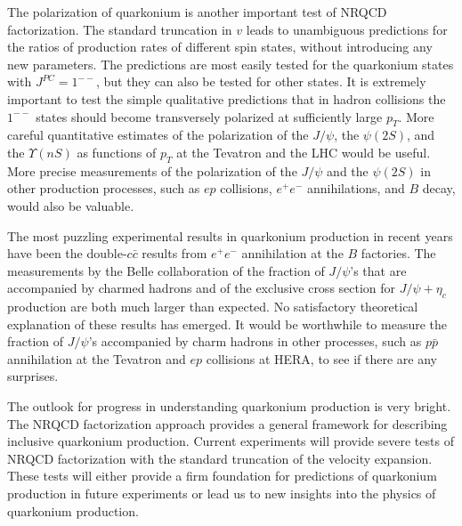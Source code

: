 The polarization of quarkonium is another important test of NRQCD
factorization.  The standard truncation in $v$ leads to unambiguous
predictions for the ratios of production rates of different
spin states,  without introducing any new parameters.  The
predictions are most easily tested for the quarkonium
states with $J^{PC} = 1^{--}$, but they can also be tested for other 
states.  It is extremely important to test the simple qualitative 
predictions that in hadron collisions the $1^{--}$ states should become 
transversely polarized at sufficiently large $p_T$.  More careful 
quantitative estimates of the polarization of the $J/\psi$, the 
$\psi(2S)$, and the
$\Upsilon (nS)$ as functions of $p_T$ at the Tevatron and the LHC
would be useful.  More precise measurements of the polarization of
the $J/\psi$ and the $\psi(2S)$ in other production processes,
such as $ep$ collisions, $e^+e^-$ annihilations, and $B$ decay, would
also be valuable.

The most puzzling experimental results in quarkonium production in recent 
years have been the double-$c \bar c$ results from $e^+e^-$ annihilation at 
the $B$ factories.  The measurements by the Belle collaboration of the 
fraction of $J/\psi$'s that are accompanied by charmed hadrons and 
of the 
exclusive cross section for $J/\psi + \eta_c$ production are both much 
larger than 
expected.  No satisfactory theoretical explanation of these results has 
emerged.  It would be worthwhile to measure the fraction of $J/\psi$'s 
accompanied by charm hadrons in other processes, such as $p \bar p$ 
annihilation at the Tevatron and $ep$ collisions at HERA, to see if there 
are any surprises.

The outlook for progress in understanding quarkonium production is very 
bright.  The NRQCD factorization approach provides a general framework for 
describing inclusive quarkonium production.  Current experiments will 
provide severe tests of NRQCD factorization with the standard truncation of 
the velocity expansion.  These tests will either provide a firm 
foundation for predictions of quarkonium production in future experiments
or lead us to new insights into the physics of quarkonium production.




